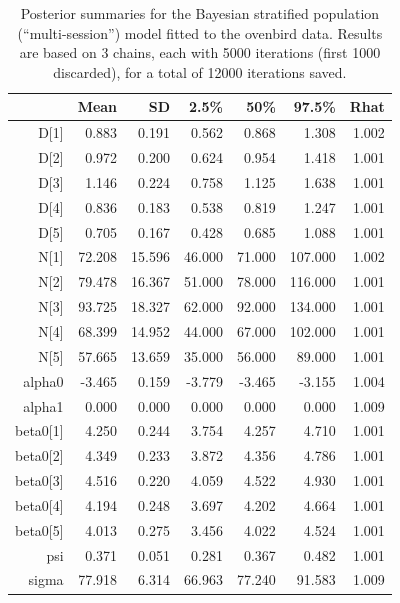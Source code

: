 \begin{table}
\caption{
Posterior summaries for the Bayesian stratified population
(``multi-session'') model fitted to the ovenbird data. 
Results are based on 
 3 chains, each with 5000 iterations (first 1000 discarded), for a
 total of 12000 iterations saved.
}
\begin{tabular}{rrrrrrr} \hline \hline
       &   Mean &    SD &   2.5\%   &  50\%  &   97.5\%&  Rhat    \\ \hline
D[1]   &    0.883 &  0.191  & 0.562  & 0.868  &   1.308 &1.002   \\
D[2]   &    0.972 &  0.200  & 0.624  & 0.954  &   1.418 &1.001  \\
D[3]   &    1.146 &  0.224  & 0.758  & 1.125  &   1.638 &1.001  \\
D[4]   &    0.836 &  0.183  & 0.538  & 0.819  &   1.247 &1.001  \\
D[5]   &    0.705 &  0.167  & 0.428  & 0.685  &   1.088 &1.001  \\
N[1]   &   72.208 & 15.596  & 46.000 & 71.000 &  107.000& 1.002  \\
N[2]   &   79.478 & 16.367  & 51.000 & 78.000 &  116.000& 1.001  \\
N[3]   &   93.725 & 18.327  & 62.000 & 92.000 &  134.000& 1.001 \\
N[4]   &   68.399 & 14.952  & 44.000 & 67.000 &  102.000& 1.001 \\
N[5]    &  57.665 & 13.659  & 35.000 & 56.000 &   89.000& 1.001 \\
alpha0  &  -3.465 &  0.159  & -3.779 & -3.465 &   -3.155& 1.004  \\
alpha1  &   0.000 &  0.000  & 0.000  & 0.000  &   0.000 &1.009   \\
beta0[1]&   4.250 &  0.244  & 3.754  & 4.257  &   4.710 &1.001   \\
beta0[2]&   4.349 &  0.233  & 3.872  & 4.356  &   4.786 &1.001  \\
beta0[3]&   4.516 &  0.220  & 4.059  & 4.522  &   4.930 &1.001  \\
beta0[4]&   4.194 &  0.248  & 3.697  & 4.202  &   4.664 &1.001  \\
beta0[5]&   4.013 &  0.275  & 3.456  & 4.022  &   4.524 &1.001  \\
psi     &   0.371 &  0.051  & 0.281  & 0.367  &   0.482 &1.001  \\
sigma   &  77.918 &  6.314  & 66.963 &77.240  &   91.583& 1.009  \\ \hline
\end{tabular}
\label{hscr.tab.ovenbird}
\end{table}




